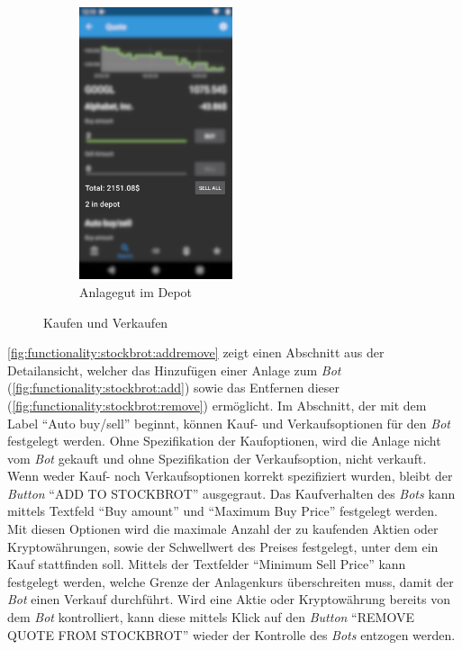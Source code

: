 \documentclass[a4paper]{article}
\begin{document}
\begin{figure}[H]
\begin{subfigure}{.5\textwidth}
		\centering
		\includegraphics[height=8cm,keepaspectratio]{./images/quote/in_depot.png}
		\caption{Anlagegut im Depot}
		\label{fig:functionality:buy-sell:in-depot}
	\end{subfigure}
	\caption{Kaufen und Verkaufen}
	\label{fig:functionality:buy-sell}
\end{figure}

\autoref{fig:functionality:stockbrot:addremove} zeigt einen Abschnitt aus der Detailansicht, welcher das Hinzufügen einer Anlage zum \textit{Bot} (\autoref{fig:functionality:stockbrot:add}) sowie das Entfernen dieser (\autoref{fig:functionality:stockbrot:remove}) ermöglicht.
Im Abschnitt, der mit dem Label "`Auto buy/sell"' beginnt, können Kauf- und Verkaufsoptionen für den \textit{Bot} festgelegt werden.
Ohne Spezifikation der Kaufoptionen, wird die Anlage nicht vom \textit{Bot} gekauft und ohne Spezifikation der Verkaufsoption, nicht verkauft.
Wenn weder Kauf- noch Verkaufsoptionen korrekt spezifiziert wurden, bleibt der \textit{Button} "`ADD TO STOCKBROT"' ausgegraut.
Das Kaufverhalten des \textit{Bots} kann mittels Textfeld "`Buy amount"' und "`Maximum Buy Price"' festgelegt werden.
Mit diesen Optionen wird die maximale Anzahl der zu kaufenden Aktien oder Kryptowährungen, sowie der Schwellwert des Preises festgelegt, unter dem ein Kauf stattfinden soll.
Mittels der Textfelder "`Minimum Sell Price"' kann festgelegt werden, welche Grenze der Anlagenkurs überschreiten muss, damit der \textit{Bot} einen Verkauf durchführt.
Wird eine Aktie oder Kryptowährung bereits von dem \textit{Bot} kontrolliert, kann diese mittels Klick auf den \textit{Button} "`REMOVE QUOTE FROM STOCKBROT"' wieder der Kontrolle des \textit{Bots} entzogen werden.
\end{document}
